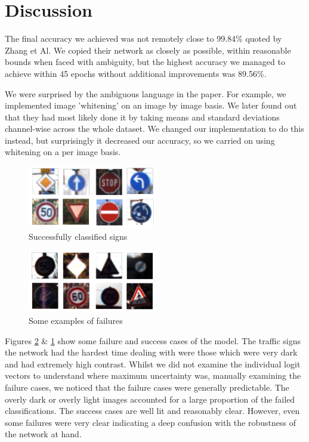 \documentclass[conference]{IEEEtran}
\begin{document}
\section{Discussion}

The final accuracy we achieved was not remotely close to 99.84\% quoted by Zhang et Al. We copied their network as closely as possible, within reasonable bounds when faced with ambiguity, but the highest accuracy we managed to achieve within 45 epochs without additional improvements was 89.56\%. 

We were surprised by the ambiguous language in the paper. For example, we implemented image 'whitening' on an image by image basis. We later found out that they had most likely done it by taking means and standard deviations channel-wise across the whole dataset. We changed our implementation to do this instead, but surprisingly it decreased our accuracy, so we carried on using whitening on a per image basis.

\begin{figure}[ht]
    \centering
    \includegraphics[width=0.5\textwidth]{Successes.png}
    \caption{Successfully classified signs}
    \label{fig:successes}
\end{figure}
\begin{figure}[ht]
    \centering
    \includegraphics[width=0.5\textwidth]{Failures.png}
    \caption{Some examples of failures}
    \label{fig:failures}
\end{figure}

Figures \ref{fig:failures} \& \ref{fig:successes} show some failure and success cases of the model. The traffic signs the network had the hardest time dealing with were those which were very dark and had extremely high contrast. Whilst we did not examine the individual logit vectors to understand where maximum uncertainty was, manually examining the failure cases, we noticed that the failure cases were generally predictable. The overly dark or overly light images accounted for a large proportion of the failed classifications. The success cases are well lit and reasonably clear. However, even some failures were very clear indicating a deep confusion with the robustness of the network at hand.
\end{document}
